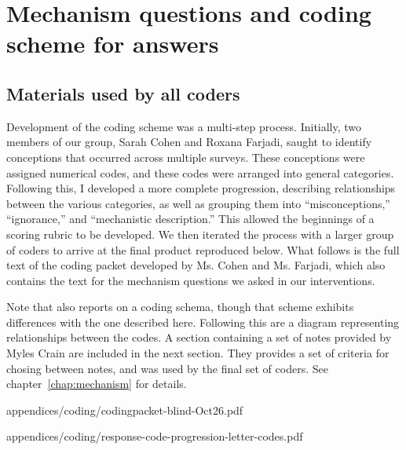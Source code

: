 \chapter{Mechanism questions and coding scheme for answers}
\label{app:coding}

\section{Materials used by all coders}
\label{sec:materials}

Development of the coding scheme was a multi-step process. Initially, two
members of our group, Sarah Cohen and Roxana Farjadi, saught to identify
conceptions that occurred across multiple surveys. These conceptions were
assigned numerical codes, and these codes were arranged into general categories.
Following this, I developed a more complete progression, describing
relationships between the various categories, as well as grouping them into
“misconceptions,” “ignorance,” and “mechanistic description.” This allowed the
beginnings of a scoring rubric to be developed. We then iterated the process
with a larger group of coders to arrive at the final product reproduced below.
What follows is the full text of the coding packet developed by Ms. Cohen and
Ms. Farjadi, which also contains the text for the mechanism questions we
asked in our interventions. 

Note that \textcite{cohen-thesis} also reports on a coding schema, though that
scheme exhibits differences with the one described here. Following this are a
diagram representing relationships between the codes. A section containing a set
of notes provided by Myles Crain are included in the next section. They provides
a set of criteria for chosing between notes, and was used by the final set of
coders. See chapter~\ref{chap:mechanism} for details.

           {appendices/coding/codingpacket-blind-Oct26.pdf}


           {appendices/coding/response-code-progression-letter-codes.pdf}


